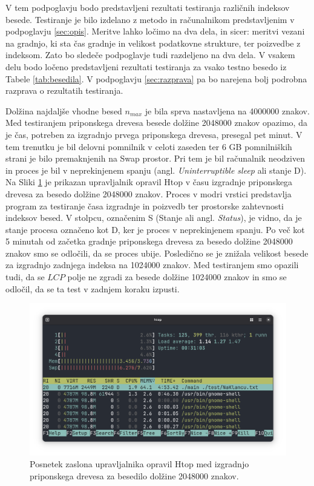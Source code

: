 V tem podpoglavju bodo predstavljeni rezultati testiranja različnih indeksov besede. Testiranje je bilo izdelano z metodo in računalnikom predstavljenim v podpoglavju \ref{sec:opis}. Meritve lahko ločimo na dva dela, in sicer: meritvi vezani na gradnjo, ki sta čas gradnje in velikost podatkovne strukture, ter poizvedbe z indeksom. Zato bo sledeče podpoglavje tudi razdeljeno na dva dela. V vsakem delu bodo ločeno predstavljeni rezultati testiranja za vsako testno besedo iz Tabele \ref{tab:besedila}. V podpoglavju \ref{sec:razprava} pa bo narejena bolj podrobna razprava o rezultatih testiranja.

Dolžina najdaljše vhodne besed $n_{max}$ je bila sprva nastavljena na 4000000 znakov. Med testiranjem priponskega drevesa besede dolžine 2048000 znakov opazimo, da je čas, potreben za izgradnjo prvega priponskega drevesa, presegal pet minut. V tem trenutku je bil delovni pomnilnik v celoti zaseden ter 6 GB pomnilniških strani je bilo premaknjenih na Swap prostor. Pri tem je bil računalnik neodziven in proces je bil v neprekinjenem spanju (angl. \textit{Uninterruptible sleep} ali stanje D). Na Sliki \ref{fig:6GB} je prikazan upravljalnik opravil Htop v času izgradnje priponskega drevesa za besedo dolžine 2048000 znakov. Proces v modri vrstici predstavlja program za testiranje časa izgradnje in poizvedb ter prostorske zahtevnosti indeksov besed. V stolpcu, označenim S (Stanje ali angl. \textit{Status}), je vidno, da je stanje procesa označeno kot D, ker je proces v neprekinjenem spanju. Po več kot 5 minutah od začetka gradnje priponskega drevesa za besedo dolžine 2048000 znakov smo se odločili, da se proces ubije. Posledično se je znižala velikost besede za izgradnjo zadnjega indeksa na 1024000 znakov. Med testiranjem smo opazili tudi, da se $LCP$ polje ne zgradi za besede dolžine 1024000 znakov in smo se odločil, da se ta test v zadnjem koraku izpusti.

\begin{figure}[tb]
    \centering
    \includegraphics[width=\textwidth]{Slike/Zaslonski posnetek 2025-06-23 22-53-56.png}

    \caption{Posnetek zaslona upravljalnika opravil Htop med izgradnjo priponskega drevesa za besedilo dolžine 2048000 znakov.} 
    \label{fig:6GB}
\end{figure}


